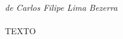 \begin{agradecimentos}

%

\emph{de Carlos Filipe Lima Bezerra} \\ \\

%

TEXTO

\end{agradecimentos}